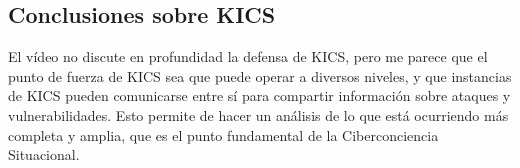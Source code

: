 
\subsection{Conclusiones sobre KICS}
El vídeo no discute en profundidad la defensa de KICS, pero me parece que el punto de fuerza de KICS sea que puede operar a diversos niveles, y que instancias de KICS pueden comunicarse entre sí para compartir información sobre ataques y vulnerabilidades.
Esto permite de hacer un análisis de lo que está ocurriendo más completa y amplia, que es el punto fundamental de la Ciberconciencia Situacional.